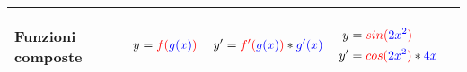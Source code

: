 \begin{center}
{\begin{tabular}{ |p{5em} | p{5em} | p{5em} | p{7em} | p{2cm}| }
            \hline
            
            \begin{center}
                Funzioni composte
            \end{center} &
            \begin{align}
                y= {\color{red}f({\color{blue}g(x)})} \nonumber
            \end{align}  &
            \begin{align}
                y'= {\color{red}f'({\color{blue}g(x)})} * {\color{blue}g'(x)} \nonumber
            \end{align} &
            {
                \begin{align}
                    y  &= {\color{red}sin({\color{blue}2x^2})}   \nonumber \\
                    y' &= {\color{red}cos({\color{blue}2x^2})} * {\color{blue}4x} \nonumber 
                \end{align}
            } &
            \begin{center}
            \end{center} \\ 

            \hline
            
        \end{tabular}
    }
\end{center}
